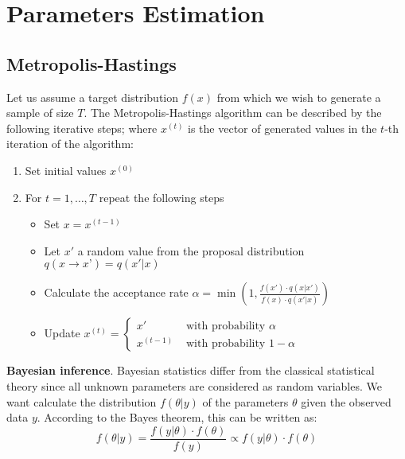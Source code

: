 \documentclass[11pt,fleqn]{book} %
\begin{document}
\chapter{Parameters Estimation}

\section{Metropolis-Hastings}

\begin{algorithm}
Let us assume a target distribution $f(x)$ from which we wish to generate a 
sample of size $T$. The Metropolis-Hastings algorithm can be described by the 
following iterative steps; where $x^{(t)}$ is the vector of generated values 
in the $t$-th iteration of the algorithm:
\begin{enumerate}
\item Set initial values $x^{(0)}$
\item For $t=1,\dots,T$ repeat the following steps
\begin{itemize}
\item Set $x=x^{(t-1)}$
\item Let $x'$ a random value from the proposal distribution $q(x \to x’)=q(x'|x)$
\item Calculate the acceptance rate 
      $\alpha = \min\left(1,\frac{f(x') \cdot q(x|x')}{f(x) \cdot q(x'|x)}\right)$
\item Update $x^{(t)}=\left\{
  \begin{array}{ll}
  x' & \textrm{ with probability } \alpha \\
  x^{(t-1)}  & \textrm{ with probability } 1-\alpha
  \end{array}\right.$ 
\end{itemize}
\end{enumerate}
\end{algorithm}



\textbf{Bayesian inference}.
Bayesian statistics differ from the classical statistical theory since all 
unknown parameters are considered as random variables.
We want calculate the distribution $f(\theta|y)$ of the parameters $\theta$ 
given the observed data $y$. According to the Bayes theorem, this can be 
written as:
\begin{displaymath}
f(\theta|y) = \frac{f(y|\theta) \cdot f(\theta)}{f(y)} \propto f(y|\theta) \cdot f(\theta)
\end{displaymath}
\end{document}
